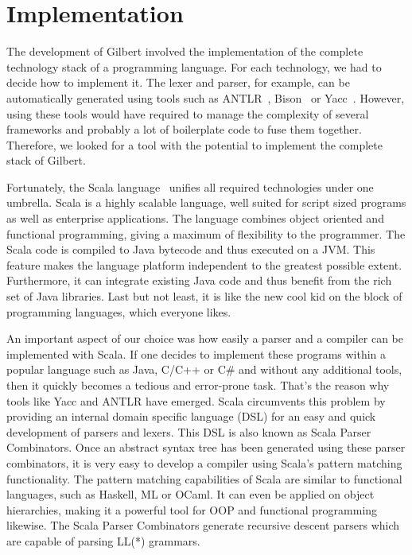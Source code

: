 \chapter{Implementation}
\label{cha:implementation}


The development of Gilbert involved the implementation of the complete technology stack of a programming language.
For each technology, we had to decide how to implement it.
The lexer and parser, for example, can be automatically generated using tools such as ANTLR~\cite{antlr}, Bison~\cite{bison} or Yacc~\cite{yacc}.
However, using these tools would have required to manage the complexity of several frameworks and probably a lot of boilerplate code to fuse them together.
Therefore, we looked for a tool with the potential to implement the complete stack of Gilbert.

Fortunately, the Scala language~\cite{scala,odersky:2010a} unifies all required technologies under one umbrella.
Scala is a highly scalable language, well suited for script sized programs as well as enterprise applications.
The language combines object oriented and functional programming, giving a maximum of flexibility to the programmer.
The Scala code is compiled to Java bytecode and thus executed on a JVM.
This feature makes the language platform independent to the greatest possible extent.
Furthermore, it can integrate existing Java code and thus benefit from the rich set of Java libraries.
Last but not least, it is like the new cool kid on the block of programming languages, which everyone likes.

An important aspect of our choice was how easily a parser and a compiler can be implemented with Scala.
If one decides to implement these programs within a popular language such as Java, C/C++ or C\# and without any additional tools, then it quickly becomes a tedious and error-prone task.
That's the reason why tools like Yacc and ANTLR have emerged.
Scala circumvents this problem by providing an internal domain specific language (DSL) for an easy and quick development of parsers and lexers.
This DSL is also known as Scala Parser Combinators.
Once an abstract syntax tree has been generated using these parser combinators, it is very easy to develop a compiler using Scala's pattern matching functionality.
The pattern matching capabilities of Scala are similar to functional languages, such as Haskell, ML or OCaml.
It can even be applied on object hierarchies, making it a powerful tool for OOP and functional programming likewise.
The Scala Parser Combinators generate recursive descent parsers which are capable of parsing LL(*) grammars.

